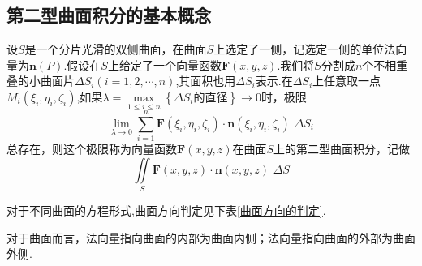 \subsection{第二型曲面积分的基本概念}
设$S$是一个分片光滑的双侧曲面，在曲面$S$上选定了一侧，记选定一侧的单位法向量为$\bm{n}(P)$.假设在$S$上给定了一个向量函数$\bm{F}(x,y,z)$.我们将$S$分割成$n$个不相重叠的小曲面片$\Delta S_i(i=1,2,\cdots,n)$,其面积也用$\Delta S_i$表示.在$\Delta S_i$上任意取一点$M_i(\xi_i,\eta_i,\zeta_i)$,如果$\lambda = \max\limits_{1 \le i \le n} \left\lbrace \Delta S_i\mbox{的直径}\right\rbrace \rightarrow 0$时，极限
\begin{equation}
	\lim_{\lambda \rightarrow 0} \sum^{n}_{i=1} \bm{F}(\xi_i,\eta_i,\zeta_i)\cdot \bm{n}(\xi_i,\eta_i,\zeta_i)\,\,\Delta S_i
\end{equation}
总存在，则这个极限称为向量函数$\bm{F}(x,y,z)$在曲面$S$上的第二型曲面积分，记做
\begin{equation}
	\iint\limits_{S} \bm{F}(x,y,z)\cdot \bm{n}(x,y,z)\,\,\Delta S
\end{equation}

\tdefination[曲面的方向]
对于不同曲面的方程形式,曲面方向判定见下表\ref{曲面方向的判定}.
\begin{table}[!htb]
	\centering
	\caption{曲面方向的判定}
	\label{曲面方向的判定}
\end{table} 
\par 对于曲面而言，法向量指向曲面的内部为曲面内侧；法向量指向曲面的外部为曲面外侧.



